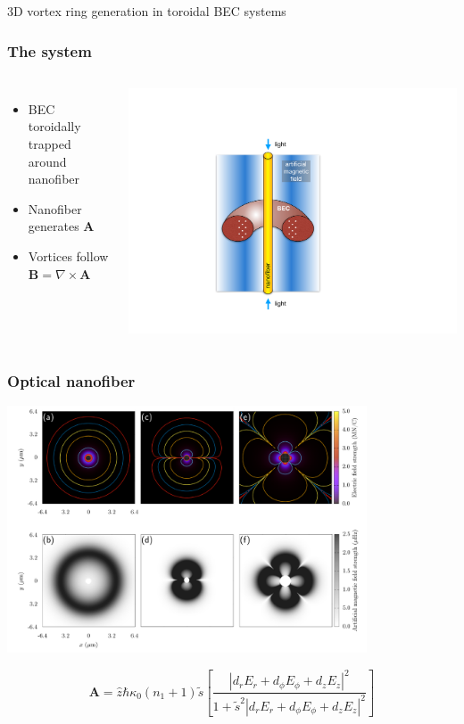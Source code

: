 \documentclass{beamer}
\begin{document}
\begin{frame}
\center \huge 3D vortex ring generation in toroidal BEC systems
\end{frame}

\begin{frame}
\frametitle{The system}

\begin{columns}

\begin{itemize}
\item BEC toroidally trapped around nanofiber
\item Nanofiber generates $\mathbf{A}$
\item Vortices follow $\mathbf{B} = \nabla \times \mathbf{A}$
\end{itemize}

\includegraphics[width=\textwidth]{../data/3d/Schematic_TB}
\end{columns}

\end{frame}

\begin{frame}
\frametitle{Optical nanofiber}
\center \includegraphics[width=0.8\textwidth]{../data/3d/all_fields.pdf}

$$
\mathbf{A} = \hat{z} \hbar \kappa_0 (n_1 + 1) \tilde{s} \left[\frac{|d_rE_r + d_{\phi}E_{\phi} + d_zE_z|^2}{1 + \tilde s^2|d_rE_r + d_{\phi}E_{\phi} + d_zE_z|^2} \right]
$$
\end{frame}
\end{document}
